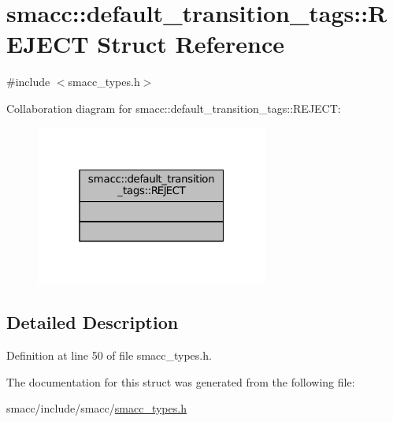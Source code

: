 \hypertarget{structsmacc_1_1default__transition__tags_1_1REJECT}{}\section{smacc\+:\+:default\+\_\+transition\+\_\+tags\+:\+:R\+E\+J\+E\+CT Struct Reference}
\label{structsmacc_1_1default__transition__tags_1_1REJECT}


{\ttfamily \#include $<$smacc\+\_\+types.\+h$>$}



Collaboration diagram for smacc\+:\+:default\+\_\+transition\+\_\+tags\+:\+:R\+E\+J\+E\+CT\+:
\nopagebreak
\begin{figure}[H]
\begin{center}
\leavevmode
\includegraphics[width=217pt]{structsmacc_1_1default__transition__tags_1_1REJECT__coll__graph}
\end{center}
\end{figure}


\subsection{Detailed Description}


Definition at line 50 of file smacc\+\_\+types.\+h.



The documentation for this struct was generated from the following file\+:\begin{DoxyCompactItemize}
\item 
smacc/include/smacc/\hyperlink{smacc__types_8h}{smacc\+\_\+types.\+h}\end{DoxyCompactItemize}
